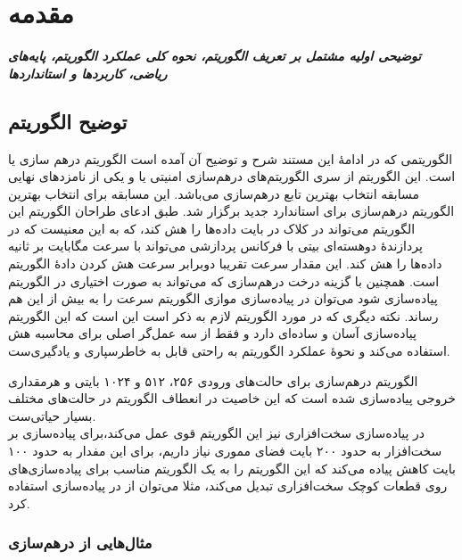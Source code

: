 \chapter{مقدمه}
\noindent
\textbf{
	\textit{
		توضیحی اولیه مشتمل بر تعریف الگوریتم، نحوه کلی عملکرد الگوریتم، پایه‌های ریاضی، کاربردها و استانداردها
	}
}
\pagebreak
\section{توضیح الگوریتم}
\par
الگوریتمی که در ادامهٔ این مستند شرح و توضیح آن آمده است الگوریتم درهم سازی 
یا 
است. این الگوریتم از سری الگوریتم‌های درهم‌سازی امنیتی یا 
و یکی از نامزدهای نهایی مسابقه انتخاب بهترین تابع درهم‌سازی 
می‌باشد. این مسابقه برای انتخاب بهترین الگوریتم در‌هم‌سازی برای استاندارد جدید 
برگزار شد. 
طبق ادعای طراحان الگوریتم این الگوریتم می‌تواند در 
کلاک در بایت داده‌ها را هش کند، که به این معنیست که در پردازندهٔ دوهسته‌ای
بیتی با فرکانس پردازشی
می‌تواند با سرعت 
مگابایت بر ثانیه داده‌ها را هش کند. این مقدار سرعت تقریبا دوبرابر سرعت هش کردن دادهٔ الگوریتم 
است. همچنین با گزینه درخت درهم‌سازی که می‌تواند به صورت اختیاری در الگوریتم پیاده‌سازی شود می‌توان 	در پیاده‌سازی موازی الگوریتم سرعت را به بیش از این هم رساند. نکته دیگری که در مورد الگوریتم 
لازم به ذکر است این است که این الگوریتم پیاده‌سازی آسان و ساده‌ای دارد و فقط از سه عمل‌گر اصلی برای محاسبه هش استفاده می‌کند و نحوهٔ عملکرد الگوریتم به راحتی قابل به خاطرسپاری و یادگیری‌ست. 
\par
الگوریتم درهم‌سازی
برای حالت‌های ورودی ۲۵۶، ۵۱۲ و ۱۰۲۴ بایتی و هرمقداری خروجی پیاده‌سازی شده است که این خاصیت در انعطاف الگوریتم در حالت‌های مختلف بسیار حیاتی‌ست. 
\\
در پیاده‌سازی سخت‌افزاری نیز این الگوریتم قوی عمل می‌کند،‌برای پیاده‌سازی 
بر سخت‌افزار به حدود ۲۰۰ بایت فضای مموری نیاز داریم، برای 
این مفدار به حدود ۱۰۰ بایت کاهش پیاده می‌کند که این الگوریتم را به یک الگوریتم مناسب برای پیاده‌سازی‌های روی قطعات کوچک سخت‌افزاری تبدیل می‌کند، مثلا می‌توان از 
در پیاده‌سازی 
استفاده کرد.
\cite{skein}
 
  
\subsection{مثال‌هایی از درهم‌سازی}


